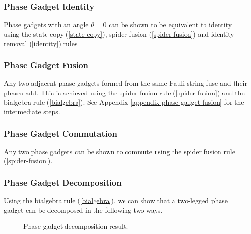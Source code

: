 
\subsubsection{Phase Gadget Identity}%
\label{phase-gadget-identity}

Phase gadgets with an angle $\theta = 0$ can be shown to be equivalent to identity using the state copy (\ref{state-copy}), spider fusion (\ref{spider-fusion}) and identity removal (\ref{identity}) rules.



\subsubsection{Phase Gadget Fusion}%
\label{phase-gadget-fusion}

Any two adjacent phase gadgets formed from the same Pauli string fuse and their phases add. This is achieved using the spider fusion rule (\ref{spider-fusion}) and the bialgebra rule (\ref{bialgebra}). See Appendix  \ref{appendix-phase-gadget-fusion} for the intermediate steps.



\subsubsection{Phase Gadget Commutation}%
\label{phase-gadget-commutation}

Any two phase gadgets can be shown to commute using the spider fusion rule (\ref{spider-fusion}).



\subsubsection{Phase Gadget Decomposition}%

Using the bialgebra rule (\ref{bialgebra}), we can show that a two-legged phase gadget can be decomposed in the following two ways.

\begin{figure}[H]
    \centering
    \caption{Phase gadget decomposition result.}
    \label{phase-gadget-decomposition}
\end{figure}

